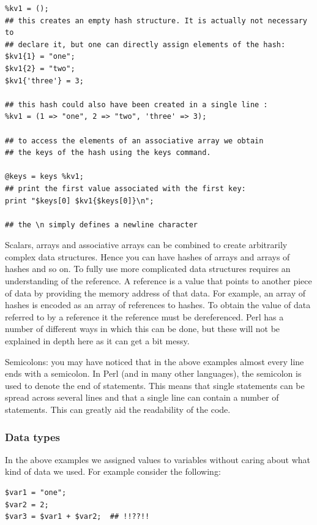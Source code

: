 \documentclass[11pt]{article}
\begin{document}
\begin{verbatim}
%kv1 = ();
## this creates an empty hash structure. It is actually not necessary to
## declare it, but one can directly assign elements of the hash:
$kv1{1} = "one";
$kv1{2} = "two";
$kv1{'three'} = 3;

## this hash could also have been created in a single line :
%kv1 = (1 => "one", 2 => "two", 'three' => 3);

## to access the elements of an associative array we obtain
## the keys of the hash using the keys command.

@keys = keys %kv1;
## print the first value associated with the first key:
print "$keys[0] $kv1{$keys[0]}\n";

## the \n simply defines a newline character
\end{verbatim}


Scalars, arrays and associative arrays can be combined to create
arbitrarily complex data structures. Hence you can have hashes of arrays
and arrays of hashes and so on. To fully use more complicated data
structures requires an understanding of the reference. A reference is a
value that points to another piece of data by providing the memory
address of that data. For example, an array of hashes is encoded as an
array of references to hashes. To obtain the value of data referred to
by a reference it the reference must be dereferenced. Perl has
a number of different ways in which this can be done, but these will not
be explained in depth here as it can get a bit messy. 

Semicolons: you may have noticed that in the above examples almost every
line ends with a semicolon. In Perl (and in many other languages), the
semicolon is used to denote the end of statements. This means
that single statements can be spread across several lines and that a
single line can contain a number of statements. This can greatly aid the
readability of the code.

\subsubsection{Data types}
\label{sec-9-0-3}

In the above examples we assigned values to variables without caring
about what kind of data we used. For example consider the following:

\begin{verbatim}
$var1 = "one";
$var2 = 2;
$var3 = $var1 + $var2;  ## !!??!!
\end{verbatim}
\end{document}
